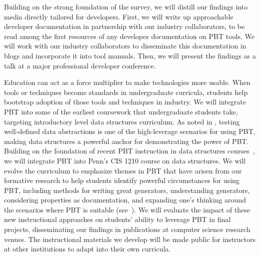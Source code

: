 Building on the strong foundation of the survey, we will distill our findings
into media directly tailored for developers. First, we will write up
approachable developer documentation in partnership with our industry
collaborators, to be read among the first resources of any developer
documentation on PBT tools. We will work with our industry collaborators to
disseminate this documentation in blogs and incorporate it into tool
manuals. Then, we will present the findings as a talk at a
major professional developer conference.

\iflater{}\fi
%
Education can act as a force multiplier to make technologies more usable.
When tools or techniques become standards in undergraduate curricula,
students help bootstrap adoption of those tools and techniques in industry. We will
integrate PBT into some of the earliest coursework that undergraduate students
take, targeting introductory level data structures
curriculum. As noted in , testing well-defined data
abstractions is one of the high-leverage scenarios for using PBT, making data
structures a powerful anchor for demonstrating the power of PBT. Building on the
foundation of recent PBT instruction in data structures
courses~\cite{wrenn2021using,nelson2021automated}, we will integrate PBT into
Penn's CIS 1210 course on data structures. We
will evolve the curriculum to emphasize themes in PBT that have arisen from our
formative research to help students identify powerful circumstances for
using PBT, including methods for writing great generators, understanding
generators, considering properties as documentation, and expanding one's
thinking around the scenarios where PBT is suitable
(see~). We will evaluate the impact of these new
instructional approaches on students' ability to leverage PBT in final projects,
disseminating our findings in publications at computer science research venues.
The instructional materials we develop will be made public for instructors at
other institutions to adapt into their own curricula.


\immediate\closeout\workplanfile


